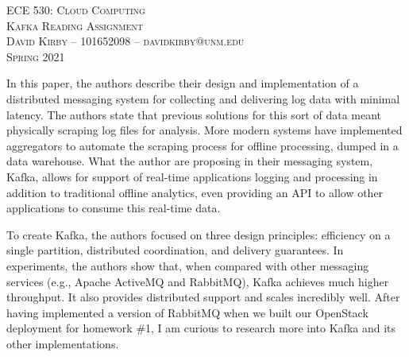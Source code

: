 \documentclass{article}
\begin{document}
\setmainfont{SF Pro Text}
\setsansfont{SF Pro Text}
\setmonofont{SF Mono}
\renewcommand{\familydefault}{\sfdefault}

\thispagestyle{empty}
\begin{center}
\textsc{\Huge{ECE 530: Cloud Computing}}\\[2em]
\textsc{\LARGE Kafka Reading Assignment}\\[2em]
\textsc{\Large David Kirby -- 101652098 -- davidkirby@unm.edu}\\[2em]
\textsc{\Large Spring 2021}
\end{center}

\hypersetup{
    linkcolor=CrispBlue,
    urlcolor=CrispBlue,
    breaklinks=true
}

In this paper, the authors describe their design and implementation of a distributed messaging system for collecting and delivering log data with minimal latency. The authors state that previous solutions for this sort of data meant physically scraping log files for analysis. More modern systems have implemented aggregators to automate the scraping process for offline processing, dumped in a data warehouse. What the author are proposing in their messaging system, Kafka, allows for support of real-time applications logging and processing in addition to traditional offline analytics, even providing an API to allow other applications to consume this real-time data.

To create Kafka, the authors focused on three design principles: efficiency on a single partition, distributed coordination, and delivery guarantees. In experiments, the authors show that, when compared with other messaging services (e.g., Apache ActiveMQ and RabbitMQ), Kafka achieves much higher throughput. It also provides distributed support and scales incredibly well. After having implemented a version of RabbitMQ when we built our OpenStack deployment for homework \#1, I am curious to research more into Kafka and its other implementations.
\end{document}

